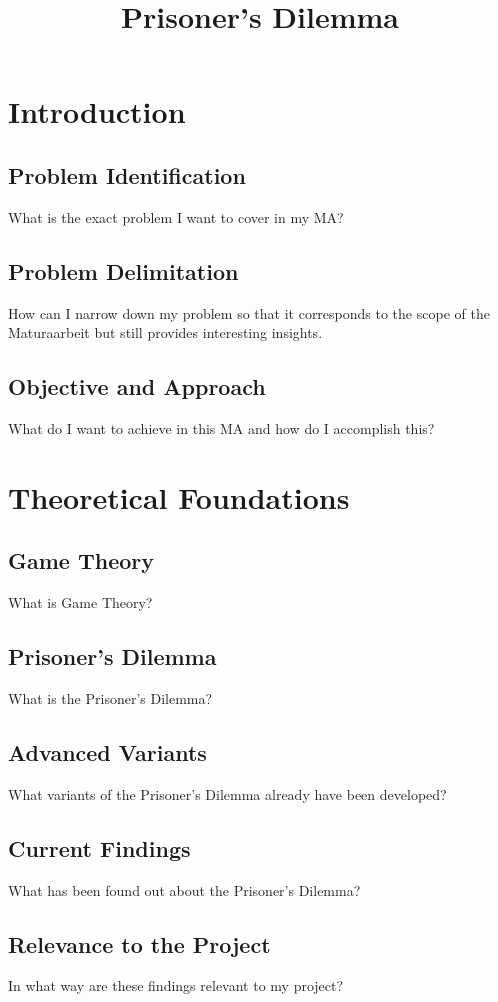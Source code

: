 \documentclass[]{article}
\begin{document}
\title{Prisoner's Dilemma}
\tableofcontents
\newpage

\begin{spacing}{0.7}


\section{Introduction}
	\subsection{Problem Identification}
		What is the exact problem I want to cover in my MA?
	\subsection{Problem Delimitation}
		How can I narrow down my problem so that it corresponds to the scope of the Maturaarbeit but still provides interesting insights.
	\subsection{Objective and Approach}
	What do I want to achieve in this MA and how do I accomplish this?

\section{Theoretical Foundations}
	\subsection{Game Theory}
		What is Game Theory?
	\subsection{Prisoner's Dilemma}
		What is the Prisoner's Dilemma?
	\subsection{Advanced Variants}
		What variants of the Prisoner's Dilemma already have been developed?
	\subsection{Current Findings}
		What has been found out about the Prisoner's Dilemma?
	\subsection{Relevance to the Project}
		In what way are these findings relevant to my project?
		


\end{spacing}
\end{document}

